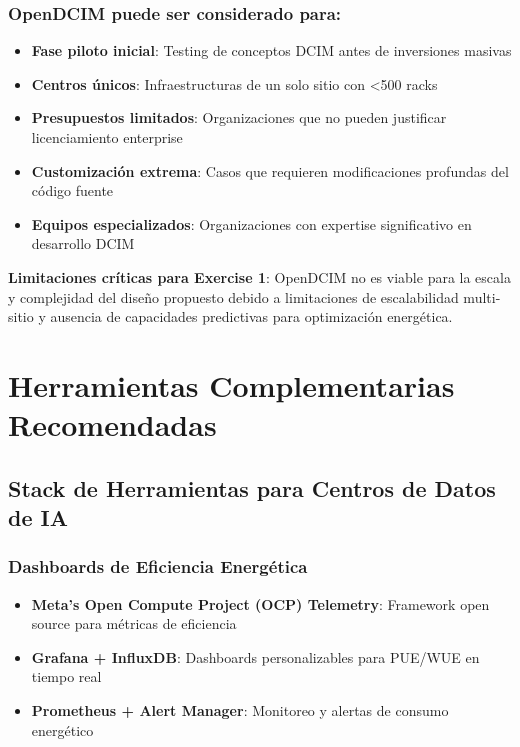 \documentclass[12pt,a4paper]{article}
\begin{document}
\subsubsection{OpenDCIM puede ser considerado para:}
\begin{itemize}
    \item \textbf{Fase piloto inicial}: Testing de conceptos DCIM antes de inversiones masivas
    \item \textbf{Centros únicos}: Infraestructuras de un solo sitio con <500 racks
    \item \textbf{Presupuestos limitados}: Organizaciones que no pueden justificar licenciamiento enterprise
    \item \textbf{Customización extrema}: Casos que requieren modificaciones profundas del código fuente
    \item \textbf{Equipos especializados}: Organizaciones con expertise significativo en desarrollo DCIM
\end{itemize}

\textbf{Limitaciones críticas para Exercise 1}: OpenDCIM no es viable para la escala y complejidad del diseño propuesto debido a limitaciones de escalabilidad multi-sitio y ausencia de capacidades predictivas para optimización energética.

\section{Herramientas Complementarias Recomendadas}

\subsection{Stack de Herramientas para Centros de Datos de IA}

\subsubsection{Dashboards de Eficiencia Energética}
\begin{itemize}
    \item \textbf{Meta's Open Compute Project (OCP) Telemetry}: Framework open source para métricas de eficiencia
    \item \textbf{Grafana + InfluxDB}: Dashboards personalizables para PUE/WUE en tiempo real
    \item \textbf{Prometheus + Alert Manager}: Monitoreo y alertas de consumo energético
\end{itemize}
\end{document}

